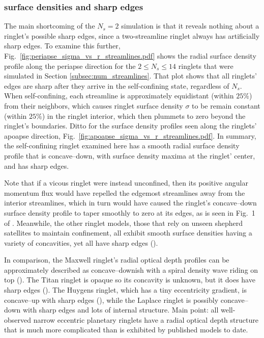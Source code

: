 \documentclass[preprint]{aastex62}
\begin{document}
\subsubsection{surface densities and sharp edges}
\label{subsubsec:sharp_edges}

The main shortcoming of the $N_s=2$ simulation is that it reveals nothing about a ringlet's
possible sharp edges, since a two-streamline ringlet always has artificially sharp edges.
To examine this further, Fig.\ \ref{fig:periapse_sigma_vs_r_streamlines.pdf} shows the radial 
surface density profile along the periapse direction for the $2\le N_s\le14$ ringlets 
that were simulated in Section \ref{subsec:num_streamlines}. That plot shows that all ringlets'
edges are sharp after they arrive in the self-confining state, regardless of $N_s$. When self-confining,
each streamline is approximately equidistant (within $25\%$) from their neighbors, which causes
ringlet surface density $\sigma$ to be remain constant (within $25\%$) in the ringlet interior, 
which then plummets to zero beyond the ringlet's boundaries. Ditto for the surface density
profiles seen along the ringlets' apoapse direction, Fig.\ \ref{fig:apoapse_sigma_vs_r_streamlines.pdf}.
In summary, the self-confining ringlet examined here has a smooth radial surface density profile that is
concave--down, with surface density maxima at the ringlet' center, and has sharp edges.

Note that if a vicous ringlet were instead unconfined, then its positive angular momentum flux
would have repelled the edgemost streamlines away from the interior streamlines, 
which in turn would have caused the ringlet's concave--down surface density profile
to taper smoothly to zero at its edges, as is seen in Fig.\ 1 of \cite{P81}.
Meanwhile, the other ringlet models, those that rely on unseen shepherd satellites to maintain confinement, all
exhibit smooth surface densities having a variety of concavities, yet all have sharp edges (\citealt{GT79, CG00, ME02}).

In comparison, the Maxwell ringlet's radial optical depth profiles can be approximately 
described as concave--downish with a spiral density wave riding on top (\citealt{Netal14}). The Titan
ringlet is opaque so its concavity is unknown, but it does have sharp edges (\citealt{Netal14}).
The Huygens ringlet, which has a tiny eccentricity gradient, is concave--up with sharp edges 
(\citealt{Fetal16}), while the Laplace ringlet is possibly concave--down with sharp edges
and lots of internal structure. Main point: all well-observed narrow eccentric planetary ringlets
have a radial optical depth structure that is much more complicated than is exhibited by
published models to date.
\end{document}
